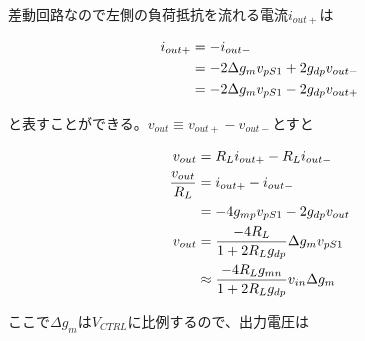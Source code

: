 \documentclass[twocolumn]{jsarticle}
\begin{document}
差動回路なので左側の負荷抵抗を流れる電流$i_{out+}$は

\begin{align}
    i_{out+}&=-i_{out-} \notag\\
    &=-2\Delta g_{m}v_{pS1}+2g_{dp}v_{out-} \notag\\
    &=-2\Delta g_{m}v_{pS1}-2g_{dp}v_{out+}
\end{align}

と表すことができる。$v_{out}\equiv v_{out+}-v_{out-}$とすと

\begin{align}
    v_{out}&=R_{L}i_{out+}-R_{L}i_{out-} \notag\\
    \frac{v_{out}}{R_L}&=i_{out+}-i_{out-} \notag\\
    &=-4g_{mp}v_{pS1}-2g_{dp}v_{out} \notag\\
    v_{out}&=\frac{-4R_{L}}{1+2R_{L}g_{dp}}\Delta g_{m}v_{pS1} \notag\\
    &\approx \frac{-4R_{L}g_{mn}}{1+2R_{L}g_{dp}}v_{in}\Delta g_{m}
\end{align}

ここで$\Delta g_{m}$は$V_{CTRL}$に比例するので、出力電圧は
\end{document}
